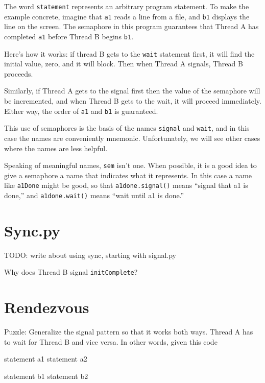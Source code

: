 \documentclass{book}
\begin{document}
The word {\tt statement} represents an arbitrary program statement.
To make the example concrete, imagine that {\tt a1} reads a line
from a file, and {\tt b1} displays the line on the screen.
The semaphore in this program guarantees that Thread A
has completed {\tt a1} before Thread B begins {\tt b1}.

Here's how it works: if thread B gets to the
    {\tt wait} statement first, it will find the initial
value, zero, and it will block.  Then when Thread A signals,
Thread B proceeds.

Similarly, if Thread A gets to the signal first then the
value of the semaphore will be incremented, and when Thread
B gets to the wait, it will proceed immediately.
Either way, the order of {\tt a1} and {\tt b1} is guaranteed.

This use of semaphores is the basis of the names {\tt signal}
and {\tt wait}, and in this case the names are conveniently
mnemonic.  Unfortunately, we will see other cases where the
names are less helpful.

Speaking of meaningful names, {\tt sem} isn't one.  When
possible, it is a good idea to give a semaphore a name
that indicates what it represents.  In this case a name like
    {\tt a1Done} might be good, so that {\tt a1done.signal()} means
``signal that a1 is done,'' and {\tt a1done.wait()} means
``wait until a1 is done.''


\section{Sync.py}
\label{sync.py}

TODO: write about using sync, starting with signal.py

Why does Thread B signal {\tt initComplete}?



\section{Rendezvous}
\label{rendezvous}

Puzzle: Generalize the signal pattern so that it works both
ways.  Thread A has to wait for Thread B and vice versa.  In other
words, given this code

\noindent\begin{minipage}[t]{0.35\textwidth}
    \begin{unbreakable}[title={Thread A}]{}
statement a1
statement a2
\end{unbreakable}
\end{minipage}
\hfill
\noindent\begin{minipage}[t]{0.35\textwidth}
    \begin{unbreakable}[title={Thread B}]{}
statement b1
statement b2
\end{unbreakable}
\end{minipage}
\end{document}
